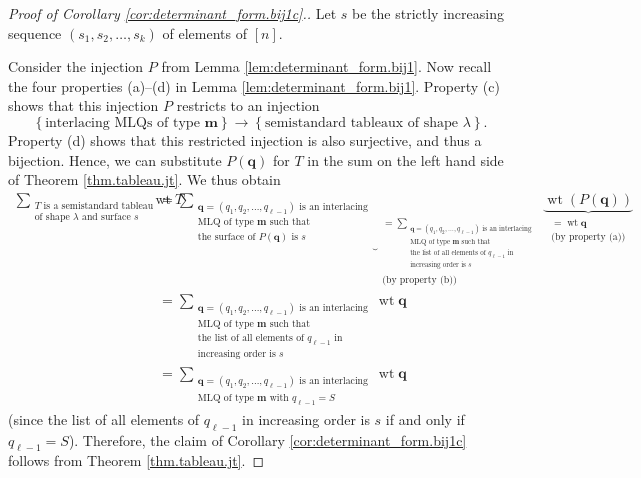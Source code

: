 \documentclass[reqno]{amsart}%
\newcommand{\0}{\phantom{c}}
\let\sumnonlimits\sum
\renewcommand{\sum}{\sumnonlimits\limits}
\theoremstyle{plain}
\theoremstyle{definition}
\numberwithin{equation}{section}
\begin{document}
\begin{proof}
[Proof of Corollary \ref{cor:determinant_form.bij1c}.]Let $s$ be the strictly
increasing sequence $\left(  s_{1},s_{2},\ldots,s_{k}\right)  $ of elements of
$\left[  n\right]  $.

Consider the injection $P$ from Lemma \ref{lem:determinant_form.bij1}. Now
recall the four properties (a)--(d) in Lemma \ref{lem:determinant_form.bij1}.
Property (c) shows that this injection $P$ restricts to an injection%
\[
\left\{  \text{interlacing MLQs of type }\mathbf{m}\right\}  \rightarrow
\left\{  \text{semistandard tableaux of shape }\lambda\right\}  .
\]
Property (d) shows that this restricted injection is also surjective, and thus
a bijection. Hence, we can substitute $P\left(  \mathbf{q}\right)  $ for $T$
in the sum on the left hand side of Theorem \ref{thm.tableau.jt}. We thus
obtain%
\begin{align*}
\sum_{\substack{T\text{ is a semistandard tableau}\\\text{of shape }%
\lambda\text{ and surface }s}}\operatorname*{wt}T  &  =\underbrace{\sum
_{\substack{\mathbf{q}=\left(  q_{1},q_{2},\ldots,q_{\ell-1}\right)  \text{ is
an interlacing}\\\text{MLQ of type }\mathbf{m}\text{ such that}\\\text{the
surface of }P\left(  \mathbf{q}\right)  \text{ is }s}}}_{\substack{=\sum
_{\substack{\mathbf{q}=\left(  q_{1},q_{2},\ldots,q_{\ell-1}\right)  \text{ is
an interlacing}\\\text{MLQ of type }\mathbf{m}\text{ such that}\\\text{the
list of all elements of }q_{\ell-1}\text{ in}\\\text{increasing order is }%
s}}\\\text{(by property (b))}}}\underbrace{\operatorname*{wt}\left(  P\left(
\mathbf{q}\right)  \right)  }_{\substack{=\operatorname*{wt}\mathbf{q}%
\\\text{(by property (a))}}}\\
&  =\sum_{\substack{\mathbf{q}=\left(  q_{1},q_{2},\ldots,q_{\ell-1}\right)
\text{ is an interlacing}\\\text{MLQ of type }\mathbf{m}\text{ such
that}\\\text{the list of all elements of }q_{\ell-1}\text{ in}%
\\\text{increasing order is }s}}\operatorname*{wt}\mathbf{q}\\
&  =\sum_{\substack{\mathbf{q}=\left(  q_{1},q_{2},\ldots,q_{\ell-1}\right)
\text{ is an interlacing}\\\text{MLQ of type }\mathbf{m}\text{ with }%
q_{\ell-1}=S}}\operatorname*{wt}\mathbf{q}%
\end{align*}
(since the list of all elements of $q_{\ell-1}$ in increasing order is $s$ if
and only if $q_{\ell-1}=S$). Therefore, the claim of Corollary
\ref{cor:determinant_form.bij1c} follows from Theorem \ref{thm.tableau.jt}.
\end{proof}
\end{document}
